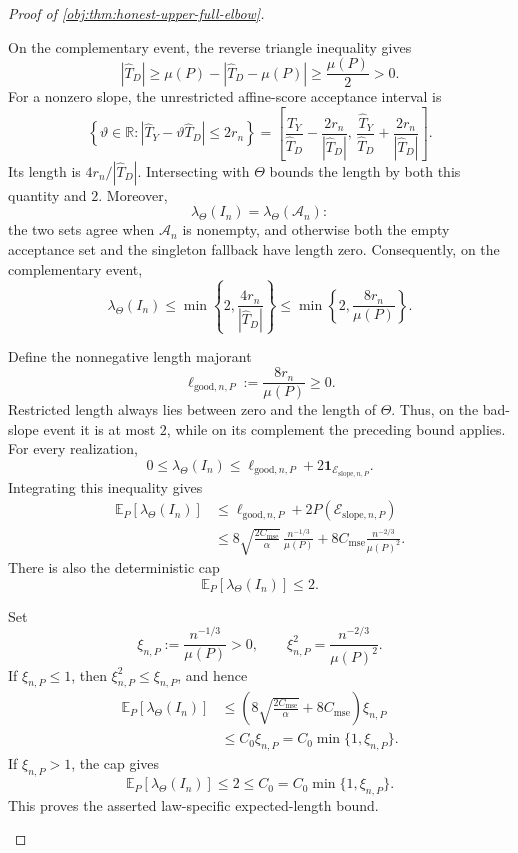 \begin{proof}[Proof of \cref{obj:thm:honest-upper-full-elbow}]
\begin{enumerate}
On the complementary event, the reverse triangle inequality gives
\[
|\widehat T_D|
\ge \mu(P)-|\widehat T_D-\mu(P)|
\ge\frac{\mu(P)}2>0.
\]
For a nonzero slope, the unrestricted affine-score acceptance interval is
\[
\left\{\vartheta\in\mathbb R:
|\widehat T_Y-\vartheta\widehat T_D|\le2r_n\right\}
=
\left[
\frac{\widehat T_Y}{\widehat T_D}
-\frac{2r_n}{|\widehat T_D|},
\,
\frac{\widehat T_Y}{\widehat T_D}
+\frac{2r_n}{|\widehat T_D|}
\right].
\]
Its length is \(4r_n/|\widehat T_D|\). Intersecting with \(\Theta\) bounds
the length by both this quantity and \(2\). Moreover,
\[
\lambda_\Theta(I_n)=\lambda_\Theta(\mathcal A_n):
\]
the two sets agree when \(\mathcal A_n\) is nonempty, and otherwise both
the empty acceptance set and the singleton fallback have length zero.
Consequently, on the complementary event,
\[
\lambda_\Theta(I_n)
\le
\min\left\{2,\frac{4r_n}{|\widehat T_D|}\right\}
\le
\min\left\{2,\frac{8r_n}{\mu(P)}\right\}.
\]

Define the nonnegative length majorant
\[
\ell_{\mathrm{good},n,P}:=\frac{8r_n}{\mu(P)}\ge0.
\]
Restricted length always lies between zero and the length of \(\Theta\).
Thus, on the bad-slope event it is at most \(2\), while on its complement
the preceding bound applies. For every realization,
\[
0\le\lambda_\Theta(I_n)
\le
\ell_{\mathrm{good},n,P}
+2\mathbf1_{\mathcal E_{\mathrm{slope},n,P}}.
\]
Integrating this inequality gives
\[
\begin{aligned}
\mathbb E_P[\lambda_\Theta(I_n)]
&\le
\ell_{\mathrm{good},n,P}
+2P(\mathcal E_{\mathrm{slope},n,P})\\
&\le
8\sqrt{\frac{2C_{\mathrm{mse}}}{\alpha}}\,
\frac{n^{-1/3}}{\mu(P)}
+
8C_{\mathrm{mse}}\frac{n^{-2/3}}{\mu(P)^2}.
\end{aligned}
\]
There is also the deterministic cap
\[
\mathbb E_P[\lambda_\Theta(I_n)]\le2.
\]

Set
\[
\xi_{n,P}:=\frac{n^{-1/3}}{\mu(P)}>0,
\qquad
\xi_{n,P}^2=\frac{n^{-2/3}}{\mu(P)^2}.
\]
If \(\xi_{n,P}\le1\), then \(\xi_{n,P}^2\le\xi_{n,P}\), and hence
\[
\begin{aligned}
\mathbb E_P[\lambda_\Theta(I_n)]
&\le
\left(
8\sqrt{\frac{2C_{\mathrm{mse}}}{\alpha}}
+8C_{\mathrm{mse}}
\right)\xi_{n,P}\\
&\le C_0\xi_{n,P}
=C_0\min\{1,\xi_{n,P}\}.
\end{aligned}
\]
If \(\xi_{n,P}>1\), the cap gives
\[
\mathbb E_P[\lambda_\Theta(I_n)]
\le2\le C_0
=C_0\min\{1,\xi_{n,P}\}.
\]
This proves the asserted law-specific expected-length bound.


\end{enumerate}
\end{proof}
